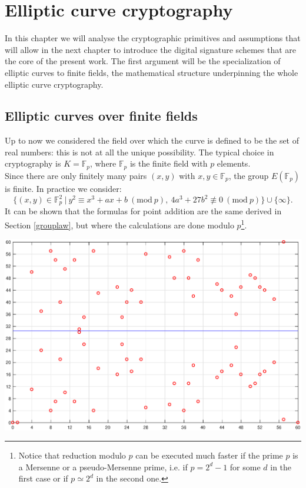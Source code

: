 \chapter{Elliptic curve cryptography}
\label{chpr:ecc}
In this chapter we will analyse the cryptographic primitives and assumptions that will allow in the next chapter to introduce the digital signature schemes that are the core of the present work. The first argument will be the specialization of elliptic curves to finite fields, the mathematical structure underpinning the whole elliptic curve cryptography.

\bigskip

\section{Elliptic curves over finite fields}
\label{ecoverff}
Up to now we considered the field over which the curve is defined to be the set of real numbers: this is not at all the unique possibility. The typical choice in cryptography is $K = \mathbb{F}_p$, where $\mathbb{F}_p$ is the finite field with $p$ elements. 
\\
Since there are only finitely many pairs $(x, y)$ with $x, y \in \mathbb{F}_p$, the group $E(\mathbb{F}_p)$ is finite.
In practice we consider: 
$$\{(x, y) \in \mathbb{F}_p^2 \ | \ y^2 \equiv x^3 + ax + b \ (\text{mod} \ p), \ 4a^3 + 27b^2 \not\equiv 0 \ (\text{mod} \ p)\} \cup \{\infty\}.$$
It can be shown that the formulas for point addition are the same derived in Section \ref{grouplaw}, but where the calculations are done modulo $p$\footnote{Notice that reduction modulo $p$ can be executed much faster if the prime $p$ is a Mersenne or a pseudo-Mersenne prime, i.e. if $p = 2^d - 1$ for some $d$ in the first case or if $p \simeq 2^d$ in the second one.}.
\\
\begin{center}
	\includegraphics[width=0.9\linewidth]{Images/ec_over_ff.eps}
	\label{fig:figure4}
\end{center}
